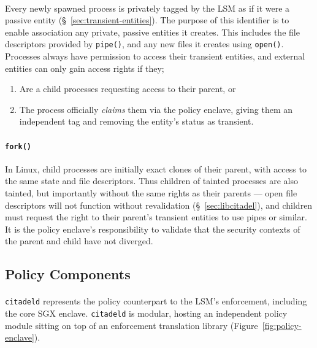 \paragraph{} Every newly spawned process is privately tagged by the LSM as if it were a passive entity (§~\ref{sec:transient-entities}). The purpose of this identifier is to enable association any private, passive entities it creates. This includes the file descriptors provided by \texttt{pipe()}, and any new files it creates using \texttt{open()}. Processes always have permission to access their transient entities, and external entities can only gain access rights if they;
\begin{enumerate}
    \item Are a child processes requesting access to their parent, or
    \item The process officially \textit{claims} them via the policy enclave, giving them an independent tag and removing the entity's status as transient. 
\end{enumerate}


\paragraph{\texttt{fork()}} In Linux, child processes are initially exact clones of their parent, with access to the same state and file descriptors. Thus children of tainted processes are also tainted, but importantly without the same rights as their parents --- open file descriptors will not function without revalidation (§~\ref{sec:libcitadel}), and children must request the right to their parent's transient entities to use pipes or similar. It is the policy enclave's responsibility to validate that the security contexts of the parent and child have not diverged. 





\subsection{Policy Components}
\label{sec:policy-enclave}

\paragraph{} \texttt{citadeld} represents the policy counterpart to the LSM's enforcement, including the core SGX enclave. \texttt{citadeld} is modular, hosting an independent policy module sitting on top of an enforcement translation library (Figure~\ref{fig:policy-enclave}).

